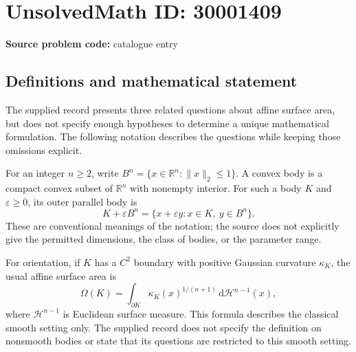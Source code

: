 \documentclass[11pt]{article}
\newcommand{\R}{\mathbb{R}}
\begin{document}
\section*{UnsolvedMath ID: 30001409}
\textbf{Source problem code:} catalogue entry
\subsection{Definitions and mathematical statement}
The supplied record presents three related questions about affine surface area, but does not specify enough hypotheses to determine a unique mathematical formulation. The following notation describes the questions while keeping those omissions explicit.

For an integer \(n\geq 2\), write \(B^n=\{x\in\R^n:\|x\|_2\leq 1\}\). A convex body is a compact convex subset of \(\R^n\) with nonempty interior. For such a body \(K\) and \(\varepsilon\geq 0\), its outer parallel body is
\[
K+\varepsilon B^n=\{x+\varepsilon y:x\in K,\ y\in B^n\}.
\]
These are conventional meanings of the notation; the source does not explicitly give the permitted dimensions, the class of bodies, or the parameter range.

For orientation, if \(K\) has a \(C^2\) boundary with positive Gaussian curvature \(\kappa_K\), the usual affine surface area is
\[
\Omega(K)=\int_{\partial K}\kappa_K(x)^{1/(n+1)}\,\mathrm{d}\mathcal H^{n-1}(x),
\]
where \(\mathcal H^{n-1}\) is Euclidean surface measure. This formula describes the classical smooth setting only. The supplied record does not specify the definition on nonsmooth bodies or state that its questions are restricted to this smooth setting.
\end{document}
